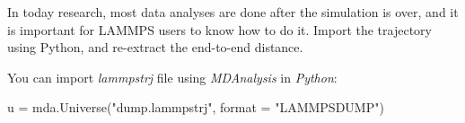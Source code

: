 \noindent In today research, most data analyses are
done after the simulation is over, and it is important for
LAMMPS users to know how to do it.
Import the trajectory using Python, and re-extract the
end-to-end distance.

\begin{tcolorbox}[colback=mylightblue!5!white,colframe=mylightblue!75!black,title=Hints]
You can import \textit{lammpstrj} file using \textit{MDAnalysis} in \textit{Python}:
\begin{lcverbatim}
u = mda.Universe("dump.lammpstrj", format = "LAMMPSDUMP")
\end{lcverbatim}

\noindent \end{tcolorbox}

